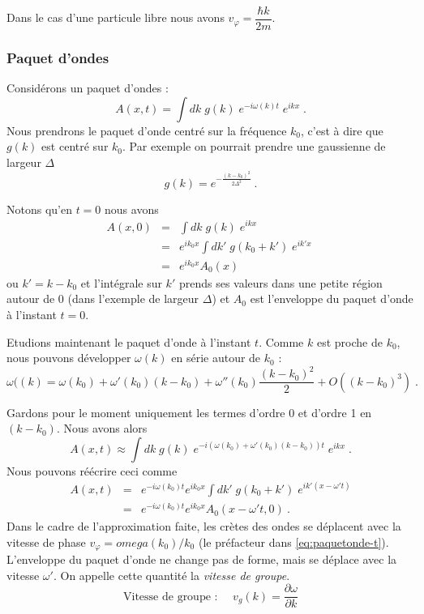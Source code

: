 \documentclass{book}
\begin{document}
Dans le cas d'une particule libre nous avons
$v_\varphi = \dfrac{\hbar k}{2m}$.


\subsubsection{Paquet d'ondes}
Considérons un paquet d'ondes :
$$A(x, t) = \int d k \; g(k) \; e^{-i\omega(k) t} \; e^{ikx} \; .$$
Nous prendrons le paquet d'onde centré sur la fréquence $k_0$, c'est à dire que $g(k)$ est centré sur $k_0$. 
Par exemple on pourrait prendre une gaussienne de largeur $\Delta$ 
$$g(k) = e^{-\frac{(k-k_0)^2}{2\Delta^2}}\ .$$

Notons qu'en $t=0$ nous avons
\begin{eqnarray}
A(x, 0) &=& \int d k \; g(k) \;  e^{ikx} \; \nonumber\\
&=& e^{ik_0 x} \int d k' \; g(k_0 + k') \;  e^{ik'x} \; \nonumber\\
&=& e^{ik_0 x}  A_0(x)
\end{eqnarray}
ou $k' = k-k_0$ et l'intégrale sur $k'$ prends ses valeurs dans une petite région autour de $0$ (dans l'exemple de largeur $\Delta$) et $A_0$ est l'enveloppe du paquet d'onde à l'instant $t=0$.

Etudions maintenant le paquet d'onde à l'instant $t$. 
Comme $k$ est proche de $k_0$, nous pouvons développer 
 $\omega(k)$ en série autour de $k_0$ :
$$ \omega((k) = \omega(k_0) + \omega '(k_0) (k-k_0) + \omega''(k_0) \frac{(k-k_0)^2}{2} + O((k-k_0)^3)\; .$$

Gardons pour le moment uniquement les termes d'ordre 0 et d'ordre 1 en $(k-k_0)$. Nous avons alors
\begin{equation}
A(x, t) \approx \int d k \; g(k) \; e^{-i\left( \omega(k_0) + \omega'(k_0) (k-k_0)  \right)  t} \; e^{ikx} \; .\label{eq:Axt}
\end{equation}
Nous pouvons réécrire ceci comme
\begin{eqnarray}
A(x, t) &=&  e^{-i \omega(k_0)t } e^{ik_0 x}  \int d k' \; g(k_0+k') \;  e^{ik' (x-  \omega ' t)}\nonumber\\
&=&e^{-i \omega(k_0)t } e^{ik_0 x}  A_0(x-\omega' t, 0)\ .
\label{eq:paquetonde-t}
\end{eqnarray}
Dans le cadre de l'approximation faite, les crètes des ondes se déplacent avec la vitesse de phase $v_\varphi =  omega(k_0) / k_0$ (le préfacteur dans \eqref{eq:paquetonde-t}).
L'enveloppe du paquet d'onde ne change pas de forme, mais se déplace avec la vitesse $\omega'$.
 On appelle cette quantité la \textit{vitesse de groupe}.
\begin{equation}
\boxed{
\text{Vitesse de groupe : } \quad v_g(k) = \dfrac{\partial \omega}{\partial k} 
}
\end{equation}
\end{document}

